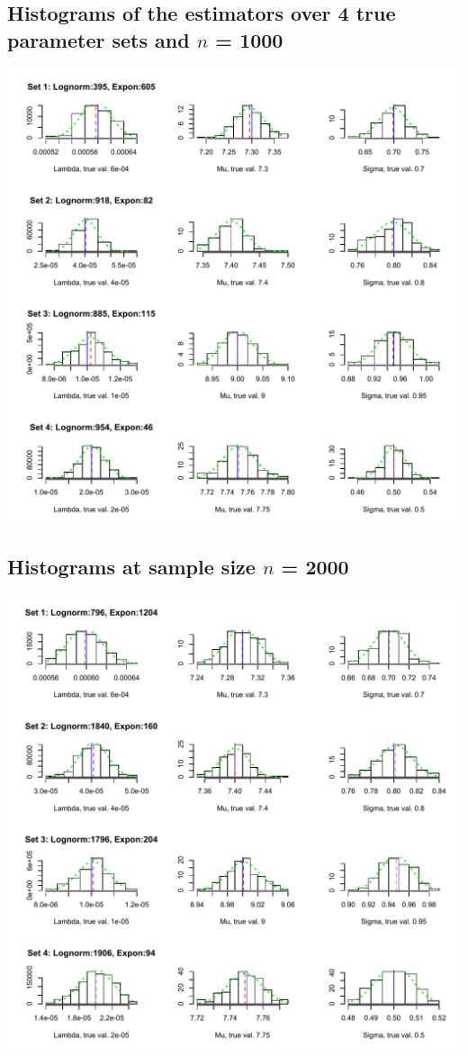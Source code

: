\documentclass{article}
\begin{document}
\subsection{Histograms of the estimators over 4 true parameter sets and $n$ = 1000}
\includegraphics{Diagram1.pdf}
\subsection{Histograms at sample size $n$ = 2000}
\includegraphics{Diagram2.pdf}
\end{document}

